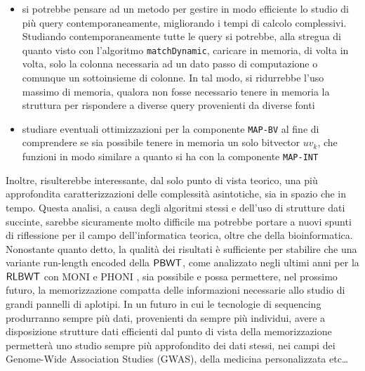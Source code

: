 \documentclass[a4paper,12pt, oneside]{book}
\newcommand{\dc}[1]{\todo[backgroundcolor=yellow]{\textbf{DC} #1}}
\def\RLBWT{\mbox{\rm {\sf RLBWT}}}
\def\PBWT{\mbox{\rm {\sf PBWT}}}
\begin{document}
\begin{itemize}
  \item si potrebbe pensare ad un metodo per gestire in modo efficiente lo
  studio di più query contemporaneamente, migliorando i tempi di calcolo
  complessivi. Studiando contemporaneamente tutte le query si potrebbe, alla
  stregua di quanto visto con l'algoritmo \texttt{matchDynamic}, caricare in
  memoria, di volta in volta, solo la 
  colonna necessaria ad un dato passo di computazione o comunque un sottoinsieme
  di colonne. In tal modo, si ridurrebbe l'uso massimo di memoria, qualora non
  fosse necessario tenere in memoria la struttura per rispondere a diverse query
  provenienti da diverse fonti
  \item studiare eventuali ottimizzazioni per la componente \texttt{MAP-BV} al
  fine di comprendere se sia possibile tenere in
  memoria un solo bitvector $uv_k$, che funzioni in modo similare a quanto si ha
  con la componente \texttt{MAP-INT}
\end{itemize}
Inoltre, risulterebbe interessante, dal solo punto di vista teorico, una più
approfondita caratterizzazioni delle complessità asintotiche, sia in spazio che
in tempo. Questa analisi, a causa degli algoritmi stessi e dell'uso di strutture
dati succinte, sarebbe sicuramente molto difficile ma potrebbe portare a nuovi
spunti di riflessione per il campo dell'informatica teorica, oltre che della
bioinformatica.\\
Nonostante quanto detto, la qualità dei risultati è sufficiente
per stabilire che una variante run-length encoded della $\PBWT$,
come analizzato negli ultimi anni per la $\RLBWT$ con
MONI \cite{moni} e PHONI \cite{phoni}, sia possibile e possa
permettere, nel prossimo futuro, la memorizzazione compatta delle informazioni
necessarie allo studio di grandi pannelli di aplotipi. In un futuro in cui le
tecnologie di sequencing produrranno sempre più dati, provenienti da sempre più
individui, avere a disposizione strutture dati efficienti dal punto di vista
della memorizzazione permetterà uno studio sempre più approfondito dei dati
stessi, nei campi dei Genome-Wide Association Studies (GWAS), della
medicina personalizzata etc\ldots 



% 
%
% 


\end{document}
